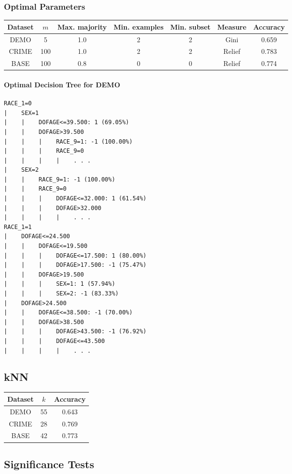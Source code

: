 \documentclass[]{article}
\begin{document}
\subsubsection{Optimal Parameters}

\begin{tabular}{|c|c|c|c|c|c|c|}
\hline
Dataset & $m$ & Max. majority & Min. examples & Min. subset & Measure & Accuracy \\
\hline
DEMO & 5 & 1.0 & 2 & 2 & Gini & 0.659 \\
CRIME & 100 & 1.0 & 2 & 2 & Relief & 0.783 \\
BASE & 100 & 0.8 & 0 & 0 & Relief & 0.774 \\
\hline
\end{tabular}

\paragraph{Optimal Decision Tree for DEMO} %
\begin{verbatim}
RACE_1=0
|    SEX=1
|    |    DOFAGE<=39.500: 1 (69.05%)
|    |    DOFAGE>39.500
|    |    |    RACE_9=1: -1 (100.00%)
|    |    |    RACE_9=0
|    |    |    |    . . .
|    SEX=2
|    |    RACE_9=1: -1 (100.00%)
|    |    RACE_9=0
|    |    |    DOFAGE<=32.000: 1 (61.54%)
|    |    |    DOFAGE>32.000
|    |    |    |    . . .
RACE_1=1
|    DOFAGE<=24.500
|    |    DOFAGE<=19.500
|    |    |    DOFAGE<=17.500: 1 (80.00%)
|    |    |    DOFAGE>17.500: -1 (75.47%)
|    |    DOFAGE>19.500
|    |    |    SEX=1: 1 (57.94%)
|    |    |    SEX=2: -1 (83.33%)
|    DOFAGE>24.500
|    |    DOFAGE<=38.500: -1 (70.00%)
|    |    DOFAGE>38.500
|    |    |    DOFAGE>43.500: -1 (76.92%)
|    |    |    DOFAGE<=43.500
|    |    |    |    . . .
\end{verbatim}

\subsection{kNN}
\begin{tabular}{|c|c|c|}
\hline
Dataset & $k$ & Accuracy \\
\hline
DEMO & 55 & 0.643 \\
CRIME & 28 & 0.769 \\
BASE & 42 & 0.773 \\
\hline
\end{tabular}


\subsection{Significance Tests}
\end{document}
